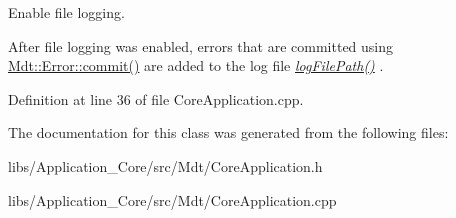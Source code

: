 Enable file logging. 

After file logging was enabled, errors that are committed using \hyperlink{class_mdt_1_1_error_a1b4a57bd4177d2985abd62b6b49a43f8}{Mdt\+::\+Error\+::commit()} are added to the log file {\itshape \hyperlink{class_mdt_1_1_core_application_a48a2915a7876c259347290f1f501df46}{log\+File\+Path()}} . 

Definition at line 36 of file Core\+Application.\+cpp.



The documentation for this class was generated from the following files\+:\begin{DoxyCompactItemize}
\item 
libs/\+Application\+\_\+\+Core/src/\+Mdt/Core\+Application.\+h\item 
libs/\+Application\+\_\+\+Core/src/\+Mdt/Core\+Application.\+cpp\end{DoxyCompactItemize}
